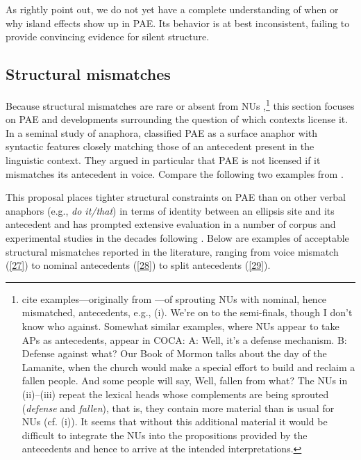 \documentclass[output=paper
	        ,collection
	        ,collectionchapter
 	        ,biblatex
                ,babelshorthands
                ,newtxmath
                ,draftmode
                ,colorlinks, citecolor=brown
]{langscibook}
\begin{document}
{\eal
{}

\zl
%
As \citet{Ginzburg2018} rightly point out, we do not yet have a complete understanding of when or why island effects show up in PAE. Its behavior is at best inconsistent, failing to provide convincing evidence for silent structure.


\subsection{Structural mismatches}
\label{sec-structural-mismatches}

Because structural mismatches are rare or absent from NUs \citep[see][]{Merchant2005a, Merchant2013},\footnote{\citet{Ginzburg2018} cite examples---originally from \citet{Beecher2008}---of sprouting NUs with nominal, hence mismatched, antecedents, e.g., (i).
	\ea We're on to the semi-finals, though I don't know who against.\z
	Somewhat similar examples, where NUs appear to take APs as antecedents, appear in COCA:
	\ea  A: Well, it's a defense mechanism. B: Defense against what?\z
	\ea Our Book of Mormon talks about the day of the Lamanite, when the church would make a special effort to build and reclaim a fallen people. And some people will say, Well, fallen from what? \z
	The NUs in (ii)--(iii) repeat the lexical heads whose complements are being sprouted (\textit{defense} and \textit{fallen}), that is, they contain more material than is usual for NUs (cf. (i)). It seems that without this additional material it would be difficult to integrate the NUs into the propositions provided by the antecedents and hence to arrive at the intended interpretations.
} this section focuses on PAE and developments surrounding the question of which contexts license it. In a seminal study of anaphora, \citet{Hankamer1976} classified PAE as a surface anaphor with syntactic features closely matching those of an antecedent present in the linguistic context. They argued in particular that PAE is not licensed if it mismatches its antecedent in voice. Compare the following two examples from \citet[327]{Hankamer1976}.

\eal
{}
\zl
This proposal places tighter structural constraints on PAE than on other verbal anaphors (e.g., \textit{do it/that}) in terms of identity between an ellipsis site and its antecedent and has prompted extensive evaluation in a number of corpus and experimental studies in the decades following \citet{Hankamer1976}. Below are examples of acceptable structural mismatches reported in the literature, ranging from voice mismatch (\ref{27}) to nominal antecedents (\ref{28}) to split antecedents (\ref{29}).

}
\end{document}
